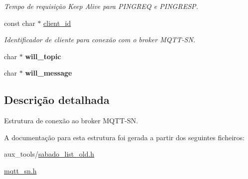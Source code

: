 \begin{DoxyCompactItemize}
\begin{DoxyCompactList}\small\item\em Tempo de requisição Keep Alive para P\+I\+N\+G\+R\+E\+Q e P\+I\+N\+G\+R\+E\+S\+P. \end{DoxyCompactList}\item 
\hypertarget{structmqtt__sn__con__t_af4ab62a1766a87b4cd8acf2448552909}{const char $\ast$ \hyperlink{structmqtt__sn__con__t_af4ab62a1766a87b4cd8acf2448552909}{client\+\_\+id}}\label{structmqtt__sn__con__t_af4ab62a1766a87b4cd8acf2448552909}

\begin{DoxyCompactList}\small\item\em Identificador de cliente para conexão com o broker M\+Q\+T\+T-\/\+S\+N. \end{DoxyCompactList}\item 
\hypertarget{structmqtt__sn__con__t_a23561785b3c6cff4ce4bdb8c1a75b571}{char $\ast$ {\bfseries will\+\_\+topic}}\label{structmqtt__sn__con__t_a23561785b3c6cff4ce4bdb8c1a75b571}

\item 
\hypertarget{structmqtt__sn__con__t_a70c7f56bdf5d7086550c75ac8bc98a08}{char $\ast$ {\bfseries will\+\_\+message}}\label{structmqtt__sn__con__t_a70c7f56bdf5d7086550c75ac8bc98a08}

\end{DoxyCompactItemize}


\subsection{Descrição detalhada}
Estrutura de conexão ao broker M\+Q\+T\+T-\/\+S\+N. 

A documentação para esta estrutura foi gerada a partir dos seguintes ficheiros\+:\begin{DoxyCompactItemize}
\item 
aux\+\_\+tools/\hyperlink{sabado__list__old_8h}{sabado\+\_\+list\+\_\+old.\+h}\item 
\hyperlink{mqtt__sn_8h}{mqtt\+\_\+sn.\+h}\end{DoxyCompactItemize}

